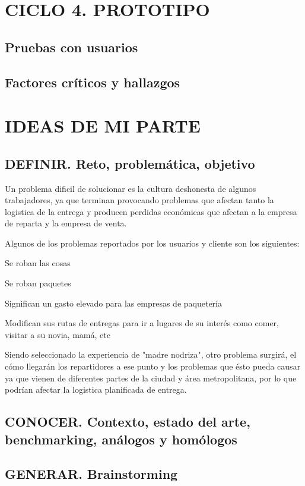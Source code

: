 \documentclass[12pt,letterpaper]{book}
\begin{document}
\newpage

\chapter{CICLO 4. PROTOTIPO}
\section{Pruebas con usuarios}
\section{Factores críticos y hallazgos}

\newpage

\chapter{IDEAS DE MI PARTE}
\section{DEFINIR. Reto, problemática, objetivo}

Un problema dificil de solucionar es la cultura deshonesta de algunos trabajadores, ya que terminan provocando problemas que afectan tanto la logistica de la entrega y producen perdidas económicas que afectan a la empresa de reparta y la empresa de venta.

Algunos de los problemas reportados por los usuarios y cliente son los siguientes:

Se roban las cosas

Se roban paquetes

Significan un gasto elevado para las empresas de paquetería

Modifican sus rutas de entregas para ir a lugares de su interés como comer, visitar a su novia, mamá, etc

Siendo seleccionado la experiencia de "madre nodriza", otro problema surgirá, el cómo llegarán los repartidores a ese punto y los problemas que ésto pueda causar ya que vienen de diferentes partes de la ciudad y área metropolitana, por lo que podrían afectar la logistica planificada de entrega.

\section{CONOCER. Contexto, estado del arte, benchmarking, análogos y homólogos}

\section{GENERAR. Brainstorming}
\end{document}
